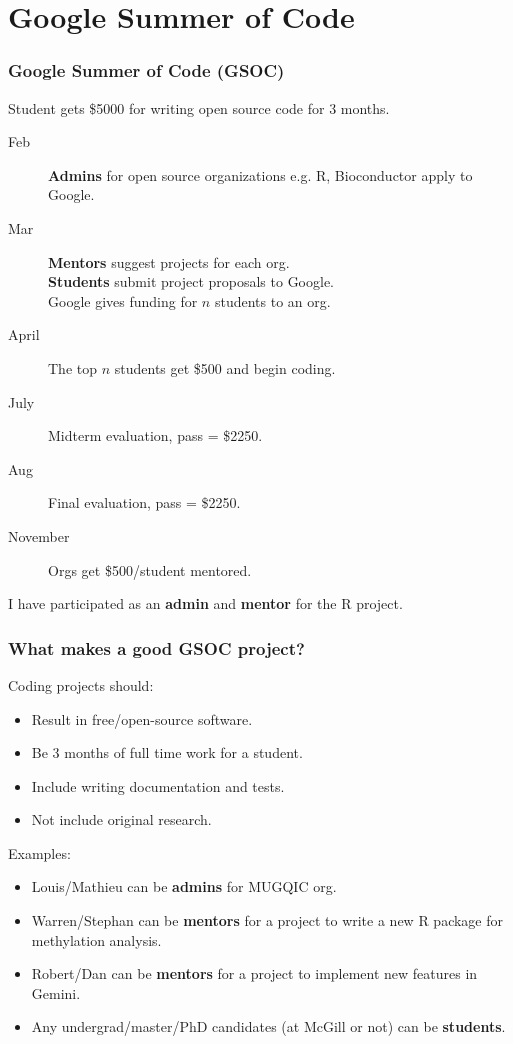 \documentclass{beamer}
\begin{document}
\section{Google Summer of Code}

\begin{frame}
  \frametitle{Google Summer of Code (GSOC)}
Student gets \$5000 for writing open source code for
    3 months.
    \begin{description}
    \item[Feb] \textbf{Admins} for open source organizations
      e.g. R, Bioconductor apply to Google.
    \item[Mar] \textbf{Mentors} suggest projects for each org.\\
      \textbf{Students} submit project proposals to Google.\\
      Google gives funding for $n$ students to an org.
    \item[April] The top $n$ students get \$500 and begin coding.
    \item[July] Midterm evaluation, pass = \$2250.
    \item[Aug] Final evaluation, pass = \$2250.
    \item[November] Orgs get \$500/student mentored.
    \end{description}

  I have participated as an \textbf{admin} and \textbf{mentor} for the
  R project.
\end{frame}

\begin{frame}
  \frametitle{What makes a good GSOC project?}
  Coding projects should:
  \begin{itemize}
  \item Result in free/open-source software.
  \item Be 3 months of full time work for a student.
  \item Include writing documentation and tests.
  \item Not include original research.
  \end{itemize}
  Examples: 
  \begin{itemize}
  \item Louis/Mathieu can be \textbf{admins} for MUGQIC org.
  \item Warren/Stephan can be \textbf{mentors} for a project to write
    a new R package for methylation analysis.
  \item Robert/Dan can be \textbf{mentors} for a project to implement
    new features in Gemini.
  \item Any undergrad/master/PhD candidates (at McGill or not)
    can be \textbf{students}.
  \end{itemize}
  
\end{frame}
\end{document}
